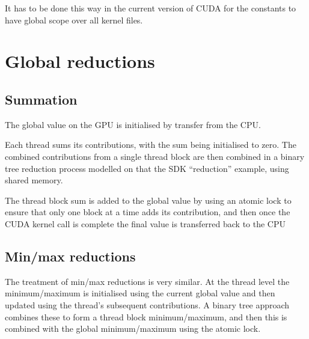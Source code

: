 \documentclass[12pt]{article}
\begin{document}
It has to be done this way in the current version of CUDA for the 
constants to have global scope over all kernel files.

\newpage

\section{Global reductions}

\subsection{Summation}

The global value on the GPU is initialised by transfer from the CPU. 

Each thread sums its contributions, with the sum being initialised to zero.
The combined contributions from a single thread block are then combined 
in a binary tree reduction process modelled on that the SDK ``reduction'' 
example, using shared memory.  

The thread block sum is added to the global value by using an atomic lock 
to ensure that only one block at a time adds its contribution, and then once 
the CUDA kernel call is complete the final value is transferred back to the CPU 

\subsection{Min/max reductions}

The treatment of min/max reductions is very similar. At the thread 
level the minimum/maximum is initialised using the current global value
and then updated using the thread's subsequent contributions.  A binary tree
approach combines these to form a thread block minimum/maximum,
and then this is combined with the global minimum/maximum using
the atomic lock.

%
%
\end{document}
